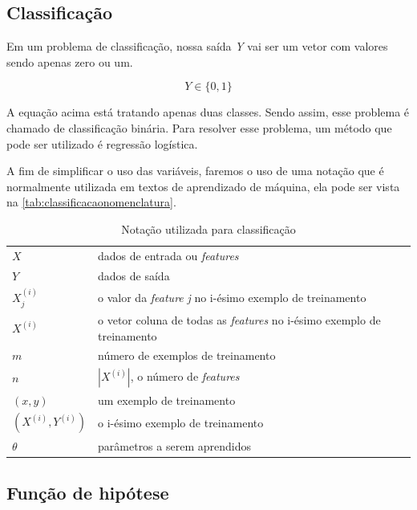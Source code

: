 


\subsection{Classificação}

Em um problema de classificação, nossa saída \textit{Y} vai ser um vetor com valores sendo apenas zero ou um.

\begin{equation}
Y \in \{0, 1\} \nonumber
\end{equation}

A equação acima está tratando apenas duas classes. Sendo assim, esse problema é chamado de classificação binária. Para resolver esse problema, um método que pode ser utilizado é regressão logística.

A fim de simplificar o uso das variáveis, faremos o uso de uma notação que é normalmente utilizada em textos de aprendizado de máquina, ela pode ser vista na \autoref{tab:classificacaonomenclatura}.

\begin{table}[!htb]
\caption{Notação utilizada para classificação} \label{tab:classificacaonomenclatura}
\begin{center}
\begin{tabular}{ll}
  \toprule
  $X$ & dados de entrada ou \textit{features} \\
  $Y$ & dados de saída \\
  $X_j^{(i)}$ & o valor da \textit{feature} \textit{j} no i-ésimo exemplo de treinamento \\
  $X^{(i)}$ & o vetor coluna de todas as \textit{features} no i-ésimo exemplo de treinamento \\
  $m$ & número de exemplos de treinamento \\
  $n$ & $|X^{(i)}|$, o número de \textit{features} \\
  $(x, y)$ & um exemplo de treinamento \\
  $(X^{(i)}, Y^{(i)})$ & o i-ésimo exemplo de treinamento \\
  $\theta$ & parâmetros a serem aprendidos \\
  \bottomrule
\end{tabular}
\end{center}

\end{table}


\subsection{Função de hipótese}

